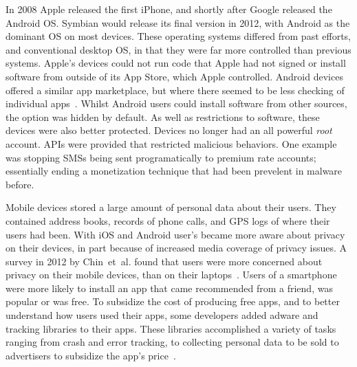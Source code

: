 \documentclass[thesis.tex]{subfiles}
\begin{document}
In 2008 Apple released the first iPhone, and shortly after Google
released the Android OS.  Symbian would release its final version in
2012, with Android as the dominant OS on most devices.  These
operating systems differed from past efforts, and conventional desktop
OS, in that they were far more controlled than previous systems.
Apple's devices could not run code that Apple had not signed or
install software from outside of its App Store, which Apple
controlled.  Android devices offered a similar app marketplace, but
where there seemed to be less checking of individual
apps~\cite{oberheide_dissecting_2012}. Whilst Android users could
install software from other sources, the option was hidden by default.
As well as restrictions to software, these devices were also better
protected.  Devices no longer had an all powerful \emph{root} account.
APIs were provided that restricted malicious behaviors.  One example
was stopping SMSs being sent programatically to premium rate accounts;
essentially ending a monetization technique that had been prevelent in
malware before. 

Mobile devices stored a large amount of personal data about their
users.  They contained address books, records of phone calls, and GPS
logs of where their users had been.  With iOS and Android user's
became more aware about privacy on their devices, in part because of
increased media coverage of privacy issues.  A survey in 2012 by
Chin~et~al{.} found that users were more concerned about privacy on
their mobile devices, than on their
laptops~\cite{chin_measuring_2012}. Users of a smartphone were more
likely to install an app that came recommended from a friend, was
popular or was free.  To subsidize the cost of producing free apps,
and to better understand how users used their apps, some developers
added adware and tracking libraries to their apps.  These libraries
accomplished a variety of tasks ranging from crash and error tracking,
to collecting personal data to be sold to advertisers to subsidize the
app's price~\cite{seungyeop_han_study_2012}.
\end{document}

